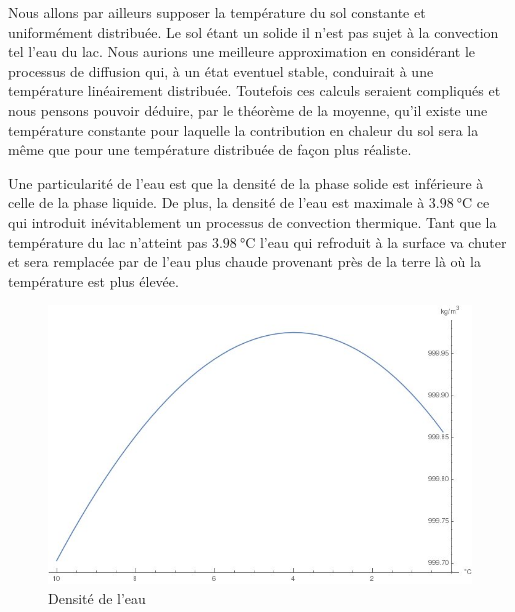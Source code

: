 \documentclass[12pt]{article}
\begin{document}
Nous allons par ailleurs supposer la temp\'erature du sol constante et uniform\'ement distribu\'ee.
Le sol \'etant un solide il n'est pas sujet \`a la convection tel l'eau du lac. Nous aurions
une meilleure approximation en consid\'erant le processus de diffusion qui, \`a un \'etat eventuel
stable, conduirait \`a une temp\'erature lin\'eairement distribu\'ee\cite{TempLinear}. Toutefois ces calculs seraient
compliqu\'es et nous pensons pouvoir d\'eduire, par le th\'eor\`eme de la moyenne\cite{AvgValue},
qu'il existe une temp\'erature constante pour laquelle la contribution en chaleur du sol sera la
m\^eme que pour une temp\'erature distribu\'ee de fa\c con plus r\'ealiste.

Une particularit\'e de l'eau est que la densit\'e de la phase solide est inf\'erieure \`a celle de
la phase liquide. De plus, la densit\'e de l'eau est maximale \`a
$\SI{3.98}{\celsius}$\cite{WaterDensity} ce qui introduit in\'evitablement un processus de
convection thermique\cite{ConvNat}. Tant que la temp\'erature du lac n'atteint pas
$\SI{3.98}{\celsius}$ l'eau qui refroduit \`a la surface va chuter et sera remplac\'ee par de l'eau
plus chaude provenant pr\`es de la terre l\`a o\`u la temp\'erature est plus \'elev\'ee.

\begin{figure}
    \centering
    \includegraphics[scale=0.5]{WaterDensity.jpeg}
    \caption{Densit\'e de l'eau}
\end{figure}
\end{document}

